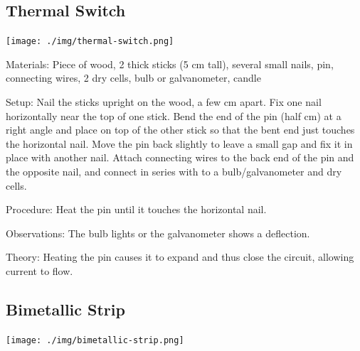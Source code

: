 \begin{multicols}{2}
\subsection{Thermal Switch}

\begin{center}
\texttt{[image: ./img/thermal-switch.png]}
\end{center}

\begin{description*}
\item[Materials:]{Piece of wood, 2 thick sticks (5 cm tall), several small nails, pin, connecting wires, 2 dry cells, bulb or galvanometer, candle}
\item[Setup:]{Nail the sticks upright on the wood, a few cm apart. Fix one nail horizontally near the top of one stick. Bend the end of the pin (half cm) at a right angle and place on top of the other stick so that the bent end just touches the horizontal nail. Move the pin back slightly to leave a small gap and fix it in place with another nail. Attach connecting wires to the back end of the pin and the opposite nail, and connect in series with to a bulb/galvanometer and dry cells.}
\item[Procedure:]{Heat the pin until it touches the horizontal nail.}
\item[Observations:]{The bulb lights or the galvanometer shows a deflection.}
\item[Theory:]{Heating the pin causes it to expand and thus close the circuit, allowing current to flow.}
\end{description*}

\subsection{Bimetallic Strip}

\begin{center}
\texttt{[image: ./img/bimetallic-strip.png]}
\end{center}


\end{multicols}
